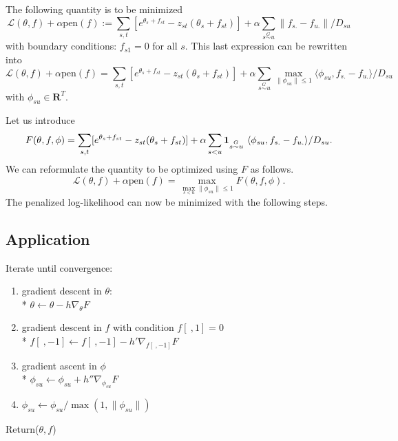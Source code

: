 \documentclass{article}
\def\pen{\textrm{pen}}
\begin{document}
The following quantity is to be minimized
$$\mathcal{L}(\theta,f)+\alpha \pen(f):=\sum_{s,t}[e^{\theta_{s}+f_{st}}-z_{st}(\theta_{s}+f_{st})]+\alpha\sum_{s\stackrel{G}{\sim}u}\|f_{s.}-f_{u.}\|/D_{su}$$
with boundary conditions: $f_{s1}=0$ for all $s$.
This last expression can be rewritten into
$$\mathcal{L}(\theta,f)+\alpha \pen(f)=\sum_{s,t}[e^{\theta_{s}+f_{st}}-z_{st}(\theta_{s}+f_{st})]+\alpha
\sum_{s\stackrel{G}{\sim}u}\max_{\|\phi_{su}\|\leq 1}\langle\phi_{su},f_{s.}-f_{u.}\rangle/D_{su}$$
with $\phi_{su}\in\mathbf R^T$.

\newpage
\noindent Let us introduce
$$F(\theta,f,\phi)=\sum_{s,t}[e^{\theta_{s}+f_{st}}-z_{st}(\theta_{s}+f_{st})]+\alpha
\sum_{s<u}{\bf 1}_{s\stackrel{G}{\sim}u}\ \langle\phi_{su},f_{s.}-f_{u.}\rangle/D_{su}.$$
We can reformulate the quantity to be optimized using $F$ as follows.
$$\mathcal{L}(\theta,f)+\alpha \pen(f)=\max_{\max_{s< u}\|\phi_{su}\|\leq 1}F(\theta,f,\phi).$$
The penalized log-likelihood can now be minimized with the following steps.

\subsection*{Application}

Iterate until convergence:
\begin{enumerate}
\item gradient descent in $\theta$:\\* $\theta\leftarrow \theta - h \nabla_{\theta}F$
\item gradient descent in $f$ with condition $f[\ ,1]=0$\\*
$f[\ ,-1]\leftarrow f[\ ,-1]-h'\nabla_{f[\ ,-1]}F$ 
\item gradient ascent in $\phi$\\*
$\phi_{su}\leftarrow \phi_{su}+h''\nabla_{\phi_{su}}F$
\item $\phi_{su}\leftarrow \phi_{su}/\max(1,\|\phi_{su}\|)$
\end{enumerate}
Return($\theta,f$)

%
%
%
%
\end{document}
